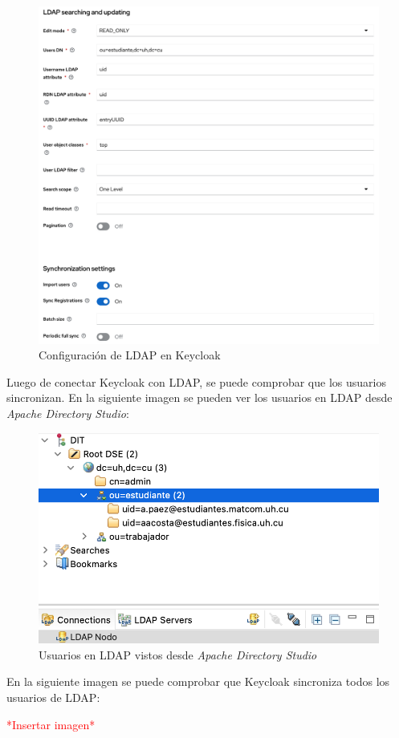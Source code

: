 \begin{enumerate}
		\begin{figure}[H]
		\centering
		\includegraphics[width=0.9\linewidth]{Graphics/keycloak_configuracion_ldap2}
		\caption{Configuración de LDAP en Keycloak}
		\label{fig:keycloakconfiguracionldap1}
	\end{figure}

	Luego de conectar Keycloak con LDAP, se puede comprobar que los usuarios sincronizan. En la siguiente imagen se pueden ver los usuarios en LDAP desde \textit{Apache Directory Studio}:
	
	\begin{figure}[H]
		\centering
		\includegraphics[width=0.7\linewidth]{Graphics/ADS_usuarios}
		\caption{Usuarios en LDAP vistos desde \textit{Apache Directory Studio}}
		\label{fig:adsusuarios}
	\end{figure}

	En la siguiente imagen se puede comprobar que Keycloak sincroniza todos los usuarios de LDAP:
	
		\textcolor{red}{*Insertar imagen*}

\end{enumerate}





